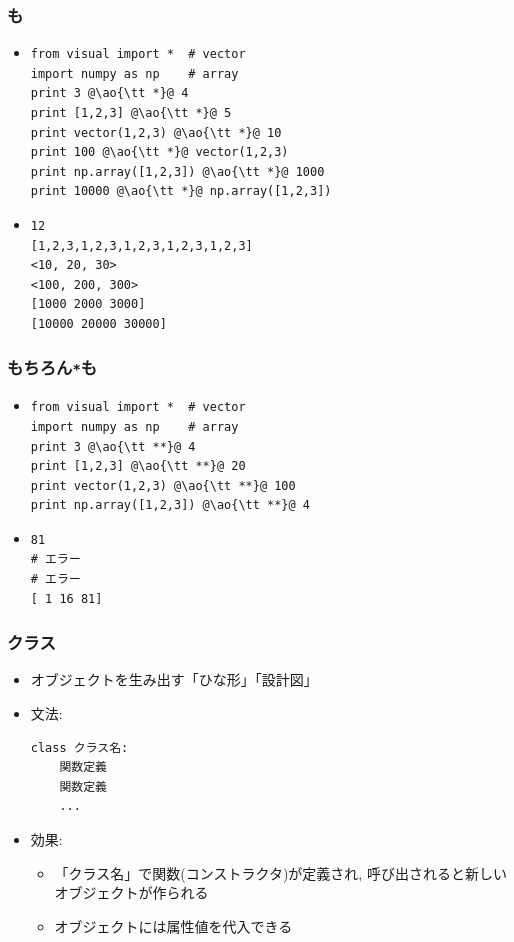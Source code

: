 \documentclass[10pt,dvipdfmx]{beamer}
\newcommand{\ao}[1]{{\color{blue}#1}}
\begin{document}
\begin{frame}[fragile]
\frametitle{{\tt *}も}
\begin{itemize}
\item<1-> []
\begin{lstlisting}
from visual import *  # vector
import numpy as np    # array
print 3 @\ao{\tt *}@ 4
print [1,2,3] @\ao{\tt *}@ 5
print vector(1,2,3) @\ao{\tt *}@ 10
print 100 @\ao{\tt *}@ vector(1,2,3)
print np.array([1,2,3]) @\ao{\tt *}@ 1000
print 10000 @\ao{\tt *}@ np.array([1,2,3])
\end{lstlisting}
\item<2-> []
\begin{lstlisting}
12
[1,2,3,1,2,3,1,2,3,1,2,3,1,2,3]
<10, 20, 30>
<100, 200, 300>
[1000 2000 3000]
[10000 20000 30000]
\end{lstlisting}
\end{itemize}
\end{frame}


\begin{frame}[fragile]
\frametitle{もちろん{\tt **}も}
\begin{itemize}
\item<1-> []
\begin{lstlisting}
from visual import *  # vector
import numpy as np    # array
print 3 @\ao{\tt **}@ 4
print [1,2,3] @\ao{\tt **}@ 20
print vector(1,2,3) @\ao{\tt **}@ 100
print np.array([1,2,3]) @\ao{\tt **}@ 4 
\end{lstlisting}
\item<2-> []
\begin{lstlisting}
81
# エラー
# エラー
[ 1 16 81]
\end{lstlisting}
\end{itemize}
\end{frame}

\iffalse

\begin{frame}[fragile]
\frametitle{クラス}
\begin{itemize}
\item オブジェクトを生み出す「ひな形」「設計図」
\item 文法:
\begin{lstlisting}
class クラス名:
    関数定義
    関数定義
    ...
\end{lstlisting}
\item 効果:
  \begin{itemize}
  \item 「クラス名」で関数(コンストラクタ)が定義され, 
    呼び出されると新しいオブジェクトが作られる
  \item オブジェクトには属性値を代入できる
  \end{itemize}
\end{itemize}
\end{frame}
\end{document}
